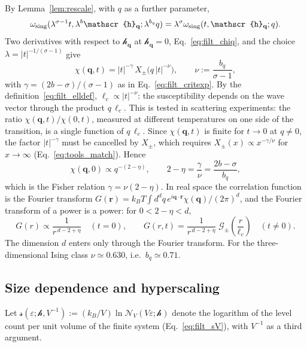 \documentclass[10pt,a4paper]{article}
\theoremstyle{plain}
\newcommand{\cN}{\mathcal{N}}   %
\newcommand{\hfield}{\mathscr{h}}  %
\newcommand{\lds}{\mathscr{s}}  %
\begin{document}
By Lemma~\ref{lem:rescale}, with $q$ as a further parameter,
\[
  \omega_{\rm sing}(\lambda^{\sigma-1}t,\lambda^{b}\hfield_{\mathbf q};\lambda^{b_q}q)
  =\lambda^{\sigma}\omega_{\rm sing}(t,\hfield_{\mathbf q};q) .
\]
Two derivatives with respect to $\hfield_{\mathbf q}$ at
$\hfield_{\mathbf q}=0$, Eq.~\eqref{eq:filt_chiq}, and the choice
$\lambda=|t|^{-1/(\sigma-1)}$ give
\begin{equation}\label{eq:filt_chiqscal}
  \chi(\mathbf q,t)=|t|^{-\gamma}\,X_\pm\big(q\,|t|^{-\nu}\big) ,
  \qquad
  \nu:=\frac{b_q}{\sigma-1} ,
\end{equation}
with $\gamma=(2b-\sigma)/(\sigma-1)$ as in Eq.~\eqref{eq:filt_critexp}. By
the definition~\eqref{eq:filt_elldef}, $\ell_c\propto|t|^{-\nu}$: the
susceptibility depends on the wave vector through the product $q\,\ell_c$.
This is tested in scattering experiments: the ratio
$\chi(\mathbf q,t)/\chi(0,t)$, measured at different temperatures on one
side of the transition, is a single function of $q\,\ell_c$.
Since $\chi(\mathbf q,t)$ is finite for $t\to0$ at $q\neq0$, the factor
$|t|^{-\gamma}$ must be cancelled by $X_\pm$, which requires
$X_\pm(x)\propto x^{-\gamma/\nu}$ for $x\to\infty$
(Eq.~\eqref{eq:tools_match}). Hence
\begin{equation}\label{eq:filt_fisher}
  \chi(\mathbf q,0)\propto q^{-(2-\eta)} ,
  \qquad 2-\eta=\frac{\gamma}{\nu}=\frac{2b-\sigma}{b_q} ,
\end{equation}
which is the Fisher relation $\gamma=\nu(2-\eta)$. In real space the
correlation function is the Fourier transform
$G(\mathbf r)=k_BT\int d^{d}q\,e^{i\mathbf q\cdot\mathbf r}\chi(\mathbf q)/(2\pi)^{d}$,
and the Fourier transform of a power is a power: for $0<2-\eta<d$,
\[
  G(r)\propto\frac{1}{r^{\,d-2+\eta}}\quad(t=0) ,\qquad
  G(r,t)=\frac{1}{r^{\,d-2+\eta}}\;\mathcal G_\pm\left(\frac{r}{\ell_c}\right)\quad(t\neq0) .
\]
The dimension $d$ enters only through the Fourier transform. For the
three-dimensional Ising class $\nu\simeq0.630$, i.e.\ $b_q\simeq0.71$.

\subsection{Size dependence and hyperscaling}
\label{sec:filt_size}

Let $\lds(\varepsilon;\hfield,V^{-1}):=(k_B/V)\ln\cN_V(V\varepsilon;\hfield)$
denote the logarithm of the level count per unit volume of the finite system
(Eq.~\eqref{eq:filt_sV}), with $V^{-1}$ as a third argument.
\end{document}
